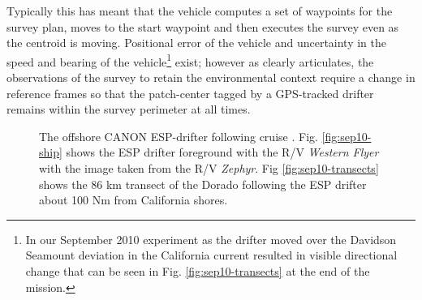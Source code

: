 Typically this has meant that the vehicle computes a set of waypoints
for the survey plan, moves to the start waypoint and then executes the
survey even as the centroid is moving. Positional error of the vehicle
and uncertainty in the speed and bearing of the vehicle\footnote{In
  our September 2010 experiment as the drifter moved over the Davidson
  Seamount \cite{clague10} deviation in the California current
  resulted in visible directional change that can be seen in
  Fig. \ref{fig:sep10-transects} at the end of the mission.} exist;
however as \cite{das11b} clearly articulates, the observations of the
survey to retain the environmental context require a change in
reference frames so that the patch-center tagged by a GPS-tracked
drifter remains within the survey perimeter at all times.


\begin{figure}
\centering
{}
  \caption{\small{The offshore CANON ESP-drifter following cruise
      \cite{das11b}. Fig. \ref{fig:sep10-ship} shows the ESP drifter
      foreground with the R/V \emph{Western Flyer} with the image
      taken from the R/V \emph{Zephyr}. Fig \ref{fig:sep10-transects}
      shows the 86 km transect of the Dorado following the ESP drifter
      about 100 Nm from California shores.}}
\label{fig:gulper}
\end{figure}



